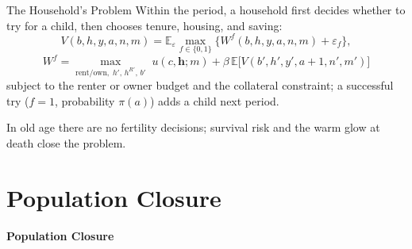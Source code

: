 \documentclass[11pt,aspectratio=169]{beamer}
\begin{document}
\begin{frame}{The Household's Problem}
Within the period, a household first decides whether to try for a child, then chooses tenure, housing, and saving:
\[
V(b,h,y,a,n,m)
= \mathbb{E}_{\varepsilon}\max_{f\in\{0,1\}}
\Big\{ W^{f}(b,h,y,a,n,m) + \varepsilon_f \Big\},
\]
\[
W^{f}
= \max_{\text{rent/own},\; h',\, h^{R\prime},\, b'}
\; u(c,\mathbf h; m) + \beta\,\mathbb{E}\big[V(b',h',y',a+1,n',m')\big]
\]
subject to the renter or owner budget and the collateral constraint; a successful try ($f=1$, probability $\pi(a)$) adds a child next period.

\medskip
In old age there are no fertility decisions; survival risk and the warm glow at death close the problem.
\end{frame}

\section{Population Closure}

\begin{frame}
\centering
{\Large\textbf{Population Closure}}
\end{frame}
\end{document}
